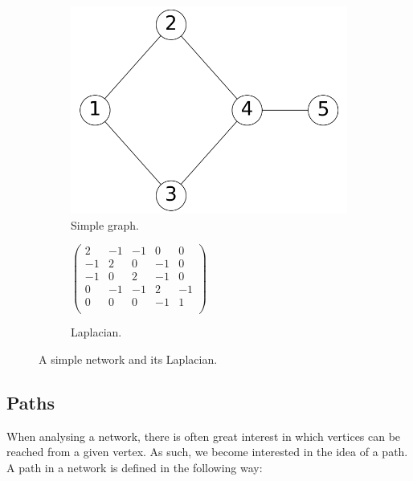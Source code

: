 \begin{figure}
    \begin{center}
        \begin{subfigure}[b]{0.45\textwidth}
            \includegraphics[width=\textwidth]{img/simple_example}
            \caption{Simple graph.}
            \label{fig:simple_network_2}
        \end{subfigure}
        \begin{subfigure}[b]{0.45\textwidth}
            \begin{center}
            $
            \begin{pmatrix}
                 2 & -1 & -1 &  0 &  0 \\
                -1 &  2 &  0 & -1 &  0 \\
                -1 &  0 &  2 & -1 &  0 \\
                 0 & -1 & -1 &  2 & -1 \\
                 0 &  0 &  0 & -1 &  1 \\
            \end{pmatrix}
            $
            \end{center}
            \caption{Laplacian.}
            \label{fig:simple_network_laplacian}
        \end{subfigure}
    \end{center}
    \caption{A simple network and its Laplacian.}
    \label{fig:simple_network_and_laplacian}
\end{figure}

\newpage
\subsection{Paths}
When analysing a network, there is often great interest in which vertices can be reached from a given vertex. As such, we become interested in the idea of a path. A path in a network is defined in the following way:

